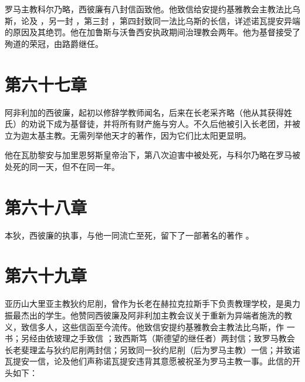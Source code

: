 罗马主教科尔乃略，西彼廉有八封信函致他。他致信给安提约基雅教会主教法比乌斯，论及 ，另一封 ，第三封 ，第四封致同一法比乌斯的长信，详述诺瓦提安异端的原因及其绝罚。他在加鲁斯与沃鲁西安执政期间治理教会两年。他为基督接受了殉道的荣冠，由路爵继任。\par


\section{第六十七章}

阿非利加的西彼廉，起初以修辞学教师闻名，后来在长老采齐略（他从其获得姓氏）的劝说下成为基督徒，并将所有财产施与穷人。不久后他被引入长老团，并被立为迦太基主教。无需列举他天才的著作，因为它们比太阳更显明。\par

他在瓦肋黎安与加里恩努斯皇帝治下，第八次迫害中被处死，与科尔乃略在罗马被处死的同一天，但不在同一年。\par


\section{第六十八章}

本狄，西彼廉的执事，与他一同流亡至死，留下了一部著名的著作 。\par


\section{第六十九章}

亚历山大里亚主教狄约尼削，曾作为长老在赫拉克拉斯手下负责教理学校，是奥力振最杰出的学生。他赞同西彼廉及阿非利加主教会议关于重新为异端者施洗的教义，致信多人，这些信函至今流传。他致信安提约基雅教会主教法比乌斯，作  一书；另经由依玻理之手致信 ；致西斯笃（斯德望的继任者）两封信；致罗马教会长老斐理孟与狄约尼削两封信；另致同一狄约尼削（后为罗马主教）一信；并致诺瓦提安一信，论及他们声称诺瓦提安违背其意愿被祝圣为罗马主教一事。此信的开头如下：\par

